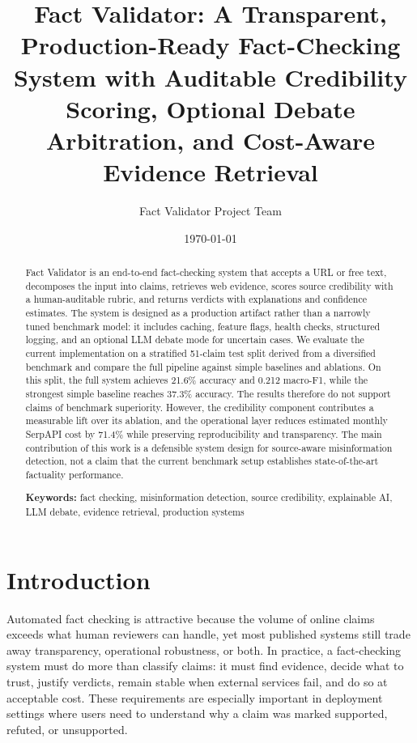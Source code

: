 \documentclass[11pt,a4paper]{article}
\title{Fact Validator: A Transparent, Production-Ready Fact-Checking System with Auditable Credibility Scoring, Optional Debate Arbitration, and Cost-Aware Evidence Retrieval}
\author{Fact Validator Project Team}
\date{\today}
\begin{document}
\maketitle

\begin{abstract}
Fact Validator is an end-to-end fact-checking system that accepts a URL or free text, decomposes the input into claims, retrieves web evidence, scores source credibility with a human-auditable rubric, and returns verdicts with explanations and confidence estimates. The system is designed as a production artifact rather than a narrowly tuned benchmark model: it includes caching, feature flags, health checks, structured logging, and an optional LLM debate mode for uncertain cases. We evaluate the current implementation on a stratified 51-claim test split derived from a diversified benchmark and compare the full pipeline against simple baselines and ablations. On this split, the full system achieves 21.6\% accuracy and 0.212 macro-F1, while the strongest simple baseline reaches 37.3\% accuracy. The results therefore do not support claims of benchmark superiority. However, the credibility component contributes a measurable lift over its ablation, and the operational layer reduces estimated monthly SerpAPI cost by 71.4\% while preserving reproducibility and transparency. The main contribution of this work is a defensible system design for source-aware misinformation detection, not a claim that the current benchmark setup establishes state-of-the-art factuality performance.

\textbf{Keywords:} fact checking, misinformation detection, source credibility, explainable AI, LLM debate, evidence retrieval, production systems
\end{abstract}

\section{Introduction}

Automated fact checking is attractive because the volume of online claims exceeds what human reviewers can handle, yet most published systems still trade away transparency, operational robustness, or both. In practice, a fact-checking system must do more than classify claims: it must find evidence, decide what to trust, justify verdicts, remain stable when external services fail, and do so at acceptable cost. These requirements are especially important in deployment settings where users need to understand why a claim was marked supported, refuted, or unsupported.
\end{document}
